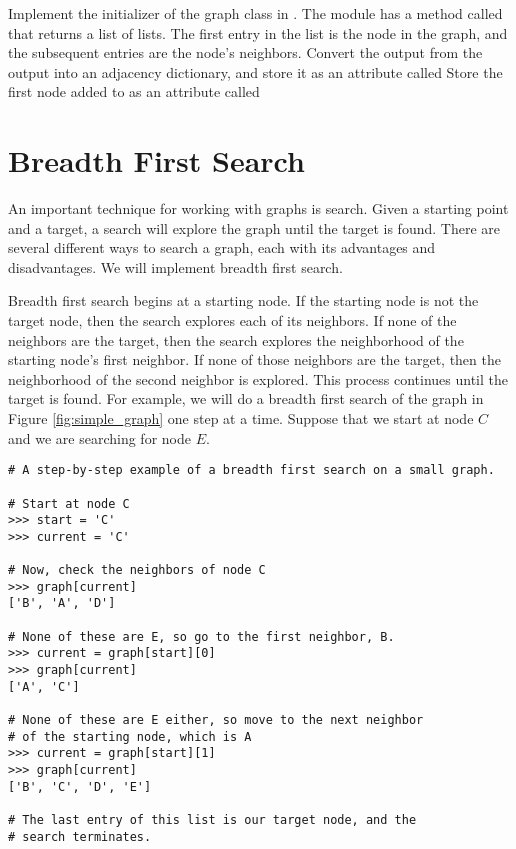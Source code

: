 \begin{problem}
Implement the initializer of the graph class in .
The  module has a method called  that returns a list of lists.
The first entry in the list is the node in the graph, and the subsequent entries are the node's neighbors.
Convert the output from the  output into an adjacency dictionary, and store it as an attribute called 
Store the first node added to  as an attribute called 
\end{problem}

\section*{Breadth First Search}

An important technique for working with graphs is search.
Given a starting point and a target, a search will explore the graph until the target is found.
There are several different ways to search a graph, each with its advantages and disadvantages.
We will implement breadth first search.

Breadth first search begins at a starting node.
If the starting node is not the target node, then the search explores each of its neighbors.
If none of the neighbors are the target, then the search explores the neighborhood of the starting node's first neighbor.
If none of those neighbors are the target, then the neighborhood of the second neighbor is explored.
This process continues until the target is found.
For example, we will do a breadth first search of the graph in Figure \ref{fig:simple_graph} one step at a time.
Suppose that we start at node $C$ and we are searching for node $E$.

\begin{lstlisting}
# A step-by-step example of a breadth first search on a small graph.

# Start at node C
>>> start = 'C'
>>> current = 'C'

# Now, check the neighbors of node C
>>> graph[current]
['B', 'A', 'D']

# None of these are E, so go to the first neighbor, B.
>>> current = graph[start][0]
>>> graph[current]
['A', 'C']

# None of these are E either, so move to the next neighbor
# of the starting node, which is A
>>> current = graph[start][1]
>>> graph[current]
['B', 'C', 'D', 'E']

# The last entry of this list is our target node, and the
# search terminates.
\end{lstlisting}

